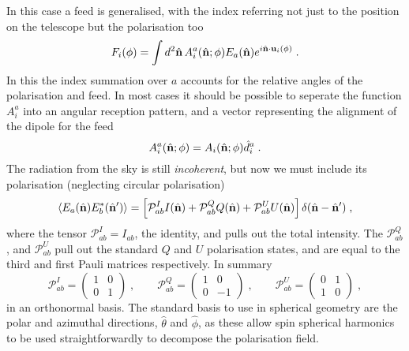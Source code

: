\documentclass{revtex4}
\newcommand{\la}{\ensuremath{\left\langle}}
\newcommand{\ra}{\ensuremath{\right\rangle}}
\begin{document}
In this case a feed is generalised, with the index referring not just
to the position on the telescope but the polarisation too
\begin{equation}
F_i(\phi) = \int d^2\hat{\mathbf{n}} \, A^a_i(\hat{\mathbf{n}}; \phi) E_a(\hat{\mathbf{n}}) e^{i
  \hat{\mathbf{n}}\cdot\mathbf{u}_i(\phi)}\; .
\end{equation}
In this the index summation over $a$ accounts for the relative angles
of the polarisation and feed. In most cases it should be possible to
seperate the function $A_i^a$ into an angular reception pattern, and a
vector representing the alignment of the dipole for the feed
\begin{equation}
A_i^a(\hat{\mathbf{n}}; \phi) = A_i(\hat{\mathbf{n}}; \phi) \hat{d}^a_i \; .
\end{equation}
The radiation from the sky is still \emph{incoherent}, but now we must
include its polarisation (neglecting circular polarisation)
\begin{equation}
\la E_a(\vnhat) E_b^* (\vnhat') \ra = \left[\mathcal{P}_{ab}^I
  I(\vnhat) + \mathcal{P}_{ab}^Q Q(\vnhat) + \mathcal{P}_{ab}^U U(\vnhat)\right]\delta(\vnhat - \vnhat') \; ,
\end{equation}
where the tensor $\mathcal{P}^I_{ab} = I_{ab}$, the identity, and pulls
out the total intensity. The $\mathcal{P}^Q_{ab}$, and
$\mathcal{P}^U_{ab}$ pull out the standard $Q$ and $U$ polarisation
states, and are equal to the third and first Pauli matrices
respectively. In summary
\begin{equation}
\mathcal{P}^I_{ab} = \begin{pmatrix} 1 & 0 \\ 0 & 1\end{pmatrix} \; ,
\qquad
\mathcal{P}^Q_{ab} = \begin{pmatrix} 1 & 0 \\ 0 & -1\end{pmatrix} \; ,
\qquad
\mathcal{P}^U_{ab} = \begin{pmatrix} 0 & 1 \\ 1 & 0\end{pmatrix} \; ,
\end{equation}
in an orthonormal basis. The standard basis to use in spherical
geometry are the polar and azimuthal directions, $\hat{\theta}$ and
$\hat{\phi}$, as these allow spin spherical harmonics to be used
straightforwardly to decompose the polarisation field.
\end{document}
